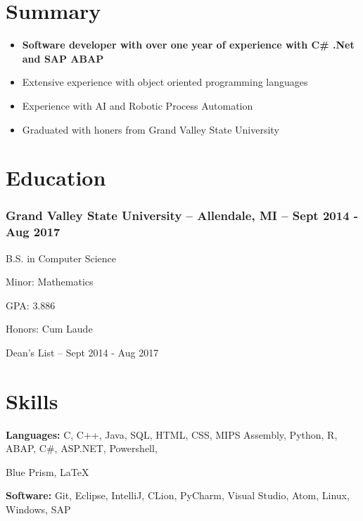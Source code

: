 \documentclass{article}
\begin{document}
	\hfill				%


  \section*{Summary}
  \begin{itemize}
    \itemsep-0.5em
  	\item \textbf{Software developer with over one year of experience with C\# .Net and SAP ABAP}
    \item Extensive experience with object oriented programming languages
    \item Experience with AI and Robotic Process Automation
    \item Graduated with honers from Grand Valley State University
  \end{itemize}

	\section*{Education}

		\subsubsection{Grand Valley State University -- Allendale, MI -- Sept 2014 - Aug 2017}
			\begin{addmargin}[1em]{0em}

				B.S. in Computer Science

				Minor: Mathematics

				GPA: 3.886

				Honors: Cum Laude

				\hspace{13mm}Dean's List -- Sept 2014 - Aug 2017

			\end{addmargin}

	\section*{Skills}
	\begin{addmargin}[0em]{0em}
		\textbf{Languages:} C, C++, Java, SQL, HTML, CSS, MIPS Assembly, Python, R, ABAP, C\#, ASP.NET, Powershell,

    \hspace{21mm}Blue Prism, \LaTeX

		\textbf{Software:} \hspace{1.5mm} Git, Eclipse, IntelliJ, CLion, PyCharm, Visual Studio, Atom, Linux, Windows, SAP
	\end{addmargin}
\end{document}
